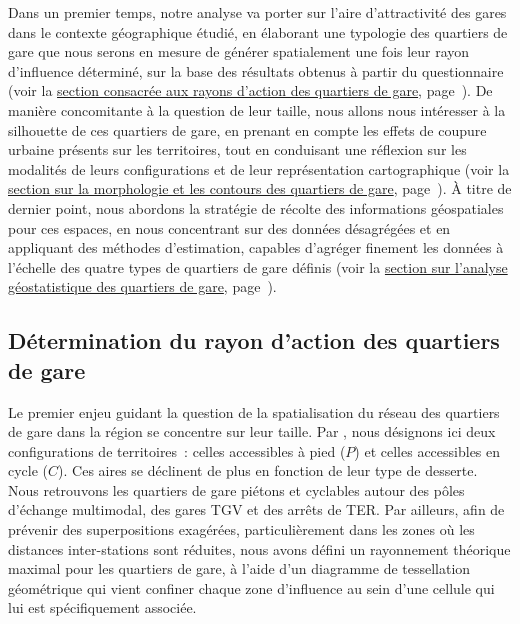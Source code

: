 \begin{refsegment}
Dans un premier temps, notre analyse va porter sur l'aire d'attractivité des gares dans le contexte géographique étudié, en élaborant une typologie des quartiers de gare que nous serons en mesure de générer spatialement une fois leur rayon d’influence déterminé, sur la base des résultats obtenus à partir du questionnaire (voir la \hyperref[chap3:quartiers-gare-distances]{section consacrée aux rayons d’action des quartiers de gare}, page~\pageref{chap3:quartiers-gare-distances}). De manière concomitante à la question de leur taille, nous allons nous intéresser à la silhouette de ces quartiers de gare, en prenant en compte les effets de \gls{coupure urbaine} présents sur les territoires, tout en conduisant une réflexion sur les modalités de leurs configurations et de leur représentation cartographique (voir la \hyperref[chap3:quartiers-gare-formes]{section sur la morphologie et les contours des quartiers de gare}, page~\pageref{chap3:quartiers-gare-formes}). À titre de dernier point, nous abordons la stratégie de récolte des informations géospatiales pour ces espaces, en nous concentrant sur des données désagrégées et en appliquant des méthodes d’estimation, capables d'agréger finement les données à l’échelle des quatre types de quartiers de gare définis (voir la \hyperref[chap3:quartiers-gare-analyse-geostatistique]{section sur l'analyse géostatistique des quartiers de gare}, page~\pageref{chap3:quartiers-gare-analyse-geostatistique}).%

\subsection{Détermination du rayon d'action des quartiers de gare
    \label{chap3:quartiers-gare-distances}
    }

Le premier enjeu guidant la question de la spatialisation du réseau des quartiers de gare dans la région se concentre sur leur taille. Par , nous désignons ici deux configurations de territoires~: celles accessibles à pied (\(P\)) et celles accessibles en cycle (\(C\)). Ces aires se déclinent de plus en fonction de leur type de desserte. Nous retrouvons les quartiers de gare piétons et cyclables autour des pôles d’échange multimodal, des gares \acrshort{TGV} et des arrêts de \acrshort{TER}. Par ailleurs, afin de prévenir des superpositions exagérées, particulièrement dans les zones où les distances inter-stations sont réduites, nous avons défini un rayonnement théorique maximal pour les quartiers de gare, à l'aide d'un diagramme de tessellation géométrique qui vient confiner chaque zone d'influence au sein d’une cellule qui lui est spécifiquement associée.%


\end{refsegment}
